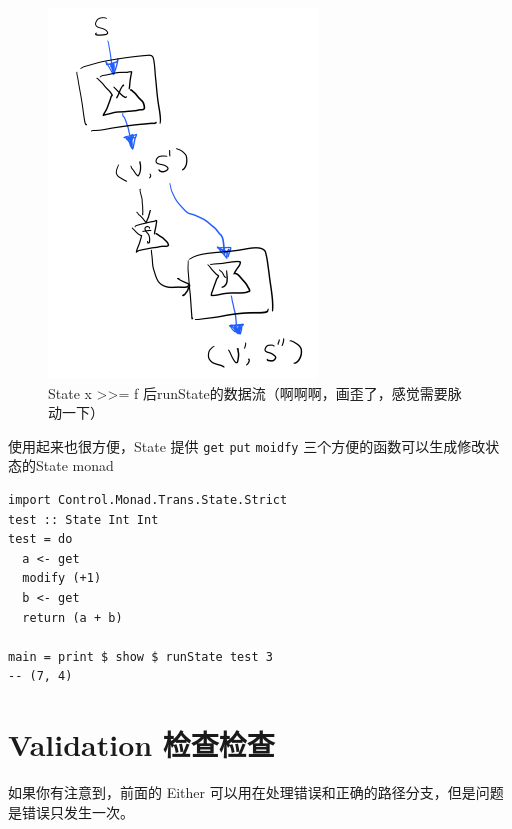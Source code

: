 \documentclass[letterspacing]{tufte-book}
\begin{document}
\begin{figure}[htbp]
\centering
\includegraphics[width=.9\linewidth]{images/p2-state-monad-bind.png}
\caption{State x >>= f 后runState的数据流（啊啊啊，画歪了，感觉需要脉动一下）}
\end{figure}

使用起来也很方便，State 提供 \texttt{get} \texttt{put} \texttt{moidfy} 三个方便的函数可以生成修改状态的State monad

\lstset{language=haskell,label= ,caption= ,captionpos=b,numbers=none}
\begin{lstlisting}
import Control.Monad.Trans.State.Strict
test :: State Int Int
test = do
  a <- get
  modify (+1)
  b <- get
  return (a + b)

main = print $ show $ runState test 3
-- (7, 4)
\end{lstlisting}


\chapter{Validation 检查检查}
\label{sec:org811d64e}
如果你有注意到，前面的 Either 可以用在处理错误和正确的路径分支，但是问题是错误只发生一次。
\end{document}
